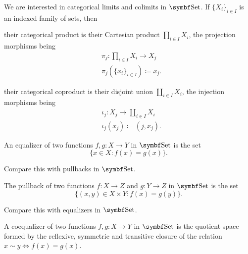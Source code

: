 \begin{theorem}\label{thm:set_categorical_limits}
  We are interested in categorical limits and colimits in \( \Bold{Set} \). If \( \{ X_i \}_{i \in I} \) is an indexed family of sets, then
  \begin{defenum}
     their categorical product is their Cartesian product \( \prod_{i \in I} X_i \), the projection morphisms being
    \begin{align*}
      &\pi_j: \prod_{i \in I} X_i \to X_j \\
      &\pi_j(\{ x_i \}_{i \in I}) \coloneqq x_j.
    \end{align*}

     their categorical coproduct is their disjoint union \( \coprod_{i \in I} X_i \), the injection morphisms being
    \begin{align*}
      &\iota_j: X_j \to \coprod_{i \in I} X_i \\
      &\iota_j(x_j) \coloneqq (j, x_j).
    \end{align*}

     An equalizer of two functions \( f, g: X \to Y \) in \( \Bold{Set} \) is the set
    \begin{equation*}
      \{ x \in X \colon f(x) = g(x) \}.
    \end{equation*}

    Compare this with pullbacks in \( \Bold{Set} \).

     The pullback of two functions \( f: X \to Z \) and \( g: Y \to Z \) in \( \Bold{Set} \) is the set
    \begin{equation*}
      \{ (x, y) \in X \times Y \colon f(x) = g(y) \}.
    \end{equation*}

    Compare this with equalizers in \( \Bold{Set} \).

     A coequalizer of two functions \( f, g: X \to Y \) in \( \Bold{Set} \) is the quotient space formed by the reflexive, symmetric and transitive closure of the relation \( x \sim y \iff f(x) = g(x) \).


\end{defenum}
\end{theorem}
